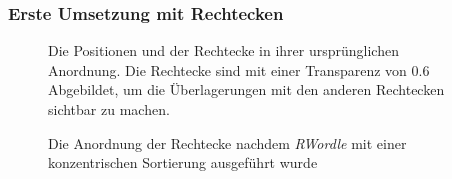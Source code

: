 \documentclass[12pt, ngerman, utf8]{article}
\begin{document}
\subsubsection{Erste Umsetzung mit Rechtecken}
\begin{figure}[h]
    \noindent
    \caption{Die Positionen und der Rechtecke in ihrer ursprünglichen Anordnung. Die Rechtecke sind mit einer Transparenz von 0.6 Abgebildet, um die Überlagerungen mit den anderen Rechtecken sichtbar zu machen.}
    \label{fig:rwordle1}
\end{figure}
\begin{figure}[h]
    \noindent
    \caption{Die Anordnung der Rechtecke nachdem \textit{RWordle} mit einer konzentrischen Sortierung ausgeführt wurde}
    \label{fig:rwordle-kon}
\end{figure}
\end{document}
